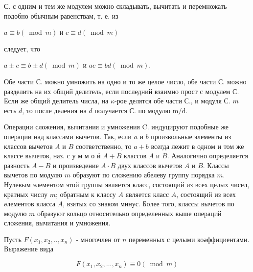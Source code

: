 \documentclass[10pt]{article}
\begin{document}
С. с одним и тем же модулем можно складывать, вычитать и перемножать подобно обычным равенствам, т. е. из



$a \equiv b(\bmod m)$ и $c \equiv d(\bmod m)$



следует, что



$a \pm c \equiv b \pm d(\bmod m)$ и $a c \equiv b d(\bmod m)$.



Обе части С. можно умножить на одно и то же целое число, обе части С. можно разделить на их общий делитель, если последний взаимно прост с модулем С. Если же общий делитель числа, на $\kappa$-рое делятся обе части С., и модуля С. $m$ есть $d$, то после деления на $d$ получается С. по модулю $\mathrm{m} / \mathrm{d}$.



Операции сложения, вычитания и умножения $\mathrm{C}$. индуцируют подобные же операции над классами вычетов. Так, если $a$ и $b$ произвольные элементы из классов вычетов $A$ и $B$ соответственно, то $a+b$ всегда лежит в одном и том же классе вычетов, наз. с у м м о ӥ $A+B$ классов $A$ и $B$. Аналогично определяется разность $A-B$ и произведение $A \cdot B$ двух классов вычетов $A$ и $B$. Классы вычетов по модулю $m$ образуют по сложению абелеву группу порядка $m$. Нулевым элементом этой группы является класс, состоящий из всех целых чисел, кратных числу $m$; обратным к классу $A$ является класс $A$, состоящий из всех әлементов класса $A$, взятых со знаком минус. Более того, классы вычетов по модулю $m$ образуют кольцо относительно определенных выше операций сложения, вычитания и умножения.



Пусть $F\left(x_{1}, x_{2}, . ., x_{n}\right)$ - многочлен от $n$ переменных с целыми коәффициентами. Выражение вида



\[

F\left(x_{1}, x_{2}, \ldots, x_{n}\right) \equiv 0(\bmod m)

\]
\end{document}
